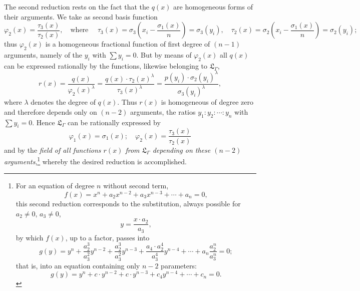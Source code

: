 \documentclass[11pt]{article}
\begin{document}
The second reduction rests on the fact that the $q(x)$ are homogeneous forms of their arguments. We take as second basis function
\[
\varphi_2(x)=\frac{\tau_3(x)}{\tau_2(x)},\quad \text{where }\quad
\tau_3(x)=\sigma_3\left(x_i-\frac{\sigma_1(x)}{n}\right)=\sigma_3(y_i),\quad
\tau_2(x)=\sigma_2\left(x_i-\frac{\sigma_1(x)}{n}\right)=\sigma_2(y_i);
\]
thus $\varphi_2(x)$ is a homogeneous fractional function of first degree of $(n-1)$ arguments, namely of the $y_i$ with $\sum y_i=0$. But by means of $\varphi_2(x)$ all $q(x)$ can be expressed rationally by the functions, likewise belonging to $\mathfrak L_\Gamma$,
\[
r(x)=\frac{q(x)}{\varphi_2(x)^\lambda}=\frac{q(x)\cdot\tau_2(x)^\lambda}{\tau_3(x)^\lambda}=\frac{p(y_i)\cdot\sigma_2(y_i)^\lambda}{\sigma_3(y_i)^\lambda},
\]
where $\lambda$ denotes the degree of $q(x)$. Thus $r(x)$ is homogeneous of degree zero and therefore depends only on $(n-2)$ arguments, the ratios $y_1:y_2:\cdots:y_n$ with $\sum y_i=0$. Hence $\mathfrak L_\Gamma$ can be rationally expressed by
\[
\varphi_1(x)=\sigma_1(x);\quad \varphi_2(x)=\frac{\tau_3(x)}{\tau_2(x)}
\]
and by the \emph{field of all functions $r(x)$ from $\mathfrak L_\Gamma$ depending on these $(n-2)$ arguments},\footnote{For an equation of degree $n$ without second term,
\[
f(x)=x^n+a_2x^{n-2}+a_3x^{n-3}+\cdots+a_n=0,
\]
this second reduction corresponds to the substitution, always possible for $a_2\neq0$, $a_3\neq0$,
\[
y=\frac{x\cdot a_2}{a_3},
\]
by which $f(x)$, up to a factor, passes into
\[
g(y)=y^n+\frac{a_2^3}{a_3^2}y^{n-2}+\frac{a_2^3}{a_3^2}y^{n-3}+\frac{a_4\cdot a_2^4}{a_3^4}y^{n-4}+\cdots+a_n\frac{a_2^n}{a_3^n}=0;
\]
that is, into an equation containing only $n-2$ parameters:
\[
g(y)=y^n+c\cdot y^{n-2}+c\cdot y^{n-3}+c_4y^{n-4}+\cdots+c_n=0.
\]} whereby the desired reduction is accomplished.
\end{document}
